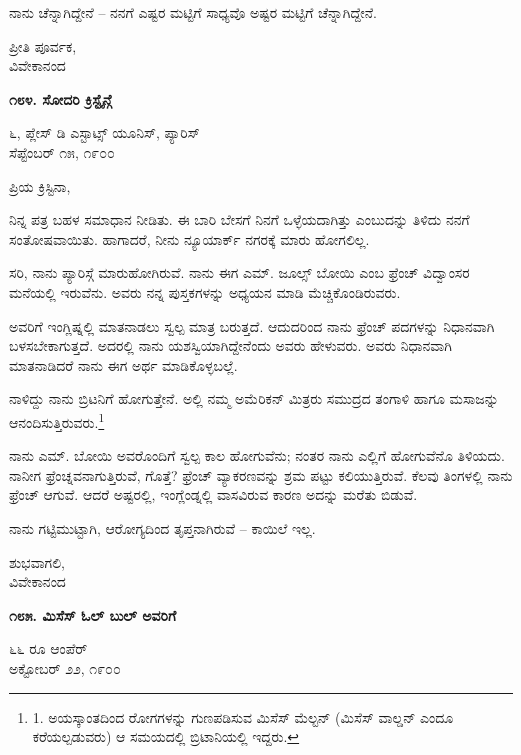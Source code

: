 ನಾನು ಚೆನ್ನಾಗಿದ್ದೇನೆ – ನನಗೆ ಎಷ್ಟರ ಮಟ್ಟಿಗೆ ಸಾಧ್ಯವೊ ಅಷ್ಟರ ಮಟ್ಟಿಗೆ ಚೆನ್ನಾಗಿದ್ದೇನೆ.

\begin{flushright}
ಪ್ರೀತಿ ಪೂರ್ವಕ,\\ವಿವೇಕಾನಂದ
\end{flushright}

\begin{center}
\textbf{೧೮೪. ಸೋದರಿ ಕ್ರಿಸ್ಟೈನ್ಗೆ}
\end{center}

\begin{flushright}
೬, ಪ್ಲೇಸ್ ಡಿ ಎಸ್ಟಾಟ್ಸ್ ಯೂನಿಸ್, ಪ್ಯಾರಿಸ್\\ಸೆಪ್ಟೆಂಬರ್ ೧೫, ೧೯೦೦
\end{flushright}

ಪ್ರಿಯ ಕ್ರಿಸ್ಟಿನಾ,

ನಿನ್ನ ಪತ್ರ ಬಹಳ ಸಮಾಧಾನ ನೀಡಿತು. ಈ ಬಾರಿ ಬೇಸಗೆ ನಿನಗೆ ಒಳ್ಳೆಯದಾಗಿತ್ತು ಎಂಬುದನ್ನು ತಿಳಿದು ನನಗೆ ಸಂತೋಷವಾಯಿತು. ಹಾಗಾದರೆ, ನೀನು ನ್ಯೂಯಾರ್ಕ್ ನಗರಕ್ಕೆ ಮಾರು ಹೋಗಲಿಲ್ಲ.

ಸರಿ, ನಾನು ಪ್ಯಾರಿಸ್ಗೆ ಮಾರುಹೋಗಿರುವೆ. ನಾನು ಈಗ ಎಮ್​. ಜೂಲ್ಸ್ ಬೋಯಿ ಎಂಬ ಫ್ರೆಂಚ್ ವಿದ್ವಾಂಸರ ಮನೆಯಲ್ಲಿ ಇರುವೆನು. ಅವರು ನನ್ನ ಪುಸ್ತಕಗಳನ್ನು ಅಧ್ಯಯನ ಮಾಡಿ ಮೆಚ್ಚಿಕೊಂಡಿರುವರು.

ಅವರಿಗೆ ಇಂಗ್ಲಿಷ್ನಲ್ಲಿ ಮಾತನಾಡಲು ಸ್ವಲ್ಪ ಮಾತ್ರ ಬರುತ್ತದೆ. ಆದುದರಿಂದ ನಾನು ಫ್ರೆಂಚ್ ಪದಗಳನ್ನು ನಿಧಾನವಾಗಿ ಬಳಸಬೇಕಾಗುತ್ತದೆ. ಅದರಲ್ಲಿ ನಾನು ಯಶಸ್ವಿಯಾಗಿದ್ದೇನೆಂದು ಅವರು ಹೇಳುವರು. ಅವರು ನಿಧಾನವಾಗಿ ಮಾತನಾಡಿದರೆ ನಾನು ಈಗ ಅರ್ಥ ಮಾಡಿಕೊಳ್ಳಬಲ್ಲೆ.

ನಾಳಿದ್ದು ನಾನು ಬ್ರಿಟನಿಗೆ ಹೋಗುತ್ತೇನೆ. ಅಲ್ಲಿ ನಮ್ಮ ಅಮೆರಿಕನ್ ಮಿತ್ರರು ಸಮುದ್ರದ ತಂಗಾಳಿ ಹಾಗೂ ಮಸಾಜನ್ನು ಆನಂದಿಸುತ್ತಿರುವರು.\footnote{1. ಅಯಸ್ಕಾಂತದಿಂದ ರೋಗಗಳನ್ನು ಗುಣಪಡಿಸುವ ಮಿಸೆಸ್ ಮೆಲ್ಟನ್ (ಮಿಸೆಸ್ ವಾಲ್ಡನ್ ಎಂದೂ ಕರೆಯಲ್ಪಡುವರು) ಆ ಸಮಯದಲ್ಲಿ ಬ್ರಿಟಾನಿಯಲ್ಲಿ ಇದ್ದರು.}

ನಾನು ಎಮ್​. ಬೋಯಿ ಅವರೊಂದಿಗೆ ಸ್ವಲ್ಪ ಕಾಲ ಹೋಗುವೆನು; ನಂತರ ನಾನು ಎಲ್ಲಿಗೆ ಹೋಗುವೆನೊ ತಿಳಿಯದು. ನಾನೀಗ ಫ್ರೆಂಚ್ನವನಾಗುತ್ತಿರುವೆ, ಗೊತ್ತೆ? ಫ್ರೆಂಚ್ ವ್ಯಾಕರಣವನ್ನು ಶ್ರಮ ಪಟ್ಟು ಕಲಿಯುತ್ತಿರುವೆ. ಕೆಲವು ತಿಂಗಳಲ್ಲಿ ನಾನು ಫ್ರೆಂಚ್ ಆಗುವೆ. ಆದರೆ ಅಷ್ಟರಲ್ಲಿ, ಇಂಗ್ಲೆಂಡ್ನಲ್ಲಿ ವಾಸವಿರುವ ಕಾರಣ ಅದನ್ನು ಮರೆತು ಬಿಡುವೆ.

ನಾನು ಗಟ್ಟಿಮುಟ್ಟಾಗಿ, ಆರೋಗ್ಯದಿಂದ ತೃಪ್ತನಾಗಿರುವೆ – ಕಾಯಿಲೆ ಇಲ್ಲ.

\begin{flushright}
ಶುಭವಾಗಲಿ,\\ವಿವೇಕಾನಂದ
\end{flushright}

\begin{center}
\textbf{೧೮೫. ಮಿಸೆಸ್ ಓಲ್ ಬುಲ್ ಅವರಿಗೆ}
\end{center}

\begin{flushright}
೬೬ ರೂ ಆಂಪೆರ್\\ಅಕ್ಟೋಬರ್ ೨೨, ೧೯೦೦
\end{flushright}

